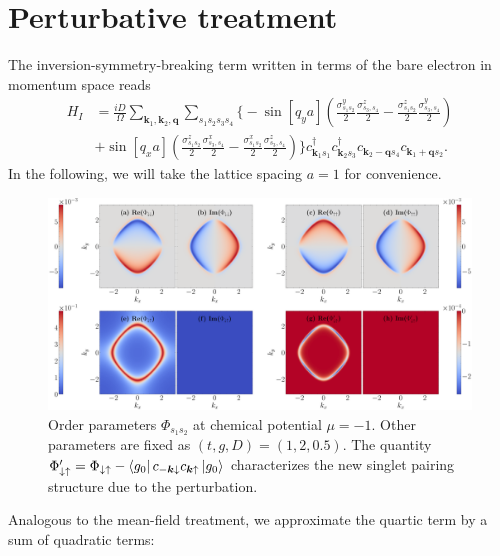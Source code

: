 \documentclass[11pt]{article}
\begin{document}
\section{Perturbative treatment}
The inversion-symmetry-breaking term written in terms of the bare electron in momentum space reads
\begin{equation}
    \begin{aligned}
    H_I &=  \frac{iD}{\Omega}\sum_{\bm k_1, \bm k_2, \bm q} \sum_{s_1 s_2 s_3 s_4} \bigg\{-\sin[q_y a] \left(\frac{\sigma^y_{s_1 s_2}}{2} \frac{\sigma^z_{s_3, s_4}}{2} - \frac{\sigma^z_{s_1 s_2}}{2} \frac{\sigma^y_{s_3, s_4}}{2}\right)\\
    &+ \sin[q_x a]
    \left(\frac{\sigma^z_{s_1 s_2}}{2} \frac{\sigma^x_{s_3, s_4}}{2}
    - \frac{\sigma^x_{s_1 s_2}}{2} \frac{\sigma^z_{s_3, s_4}}{2}\right)\bigg\}
c^\dagger_{\bm k_1 s_1} c^\dagger_{\bm{k}_2 s_3} c_{\bm {k}_2-\bm{q} s_4}
c_{\bm {k}_1 + \bm{q} s_2}.
    \end{aligned}
\end{equation}
In the following, we will take the lattice spacing $a = 1$ for convenience.
\begin{figure}[htb]
  \centering
  \includegraphics[width=\linewidth]{../plot/order_-1.0_2.0_0.5.pdf}
  \caption{Order parameters $\Phi_{s_1 s_2}$ at chemical potential $\mu = -1$. Other parameters are
  fixed as $(t, g, D) = (1, 2, 0.5)$. The quantity $\Phi^\prime_{\downarrow \uparrow} =
  \Phi_{\downarrow \uparrow} - \left \langle g_0 \right \rvert c_{-\bm k \downarrow} c_{\bm k \uparrow} \left \rvert g_0 \right \rangle$
  characterizes the new singlet pairing structure due to the perturbation.}
  \label{fig:mu=-1}
\end{figure}
Analogous to the mean-field treatment, we approximate the quartic term by a sum of quadratic terms:
\end{document}
